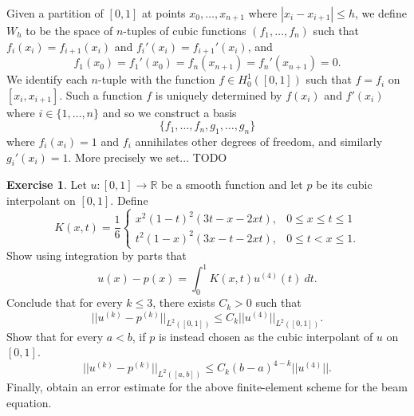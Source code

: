 \documentclass[10pt]{article}
\newcommand{\RR}{\mathbb{R}}
\theoremstyle{definition}
\newtheorem{exer}{Exercise}
\begin{document}
Given a partition of $[0, 1]$ at points $x_0, \dots, x_{n + 1}$ where $|x_i - x_{i + 1}| \leq h$, we define $W_h$ to be the space of $n$-tuples of cubic functions $(f_1, \dots, f_n)$ such that $f_i(x_i) = f_{i + 1}(x_i)$ and $f_i'(x_i) = f_{i + 1}'(x_i)$, and
$$f_1(x_0) = f_1'(x_0) = f_n(x_{n + 1}) = f_n'(x_{n + 1}) = 0.$$
We identify each $n$-tuple with the function $f \in H^1_0([0, 1])$ such that $f = f_i$ on $[x_i, x_{i + 1}]$.
Such a function $f$ is uniquely determined by $f(x_i)$ and $f'(x_i)$ where $i \in \{1, \dots, n\}$ and so we construct a basis
$$\{f_1, \dots, f_n, g_1, \dots, g_n\}$$
where $f_i(x_i) = 1$ and $f_i$ annihilates other degrees of freedom, and similarly $g_i'(x_i) = 1$.
More precisely we set... TODO

\begin{exer}
Let $u: [0, 1] \to \RR$ be a smooth function and let $p$ be its cubic interpolant on $[0, 1]$.
Define 
$$K(x, t) = \frac{1}{6} \begin{cases} x^2 (1 - t)^2 (3t - x - 2xt), & 0 \leq x \leq t \leq 1 \\
t^2(1 - x)^2(3x - t - 2xt), & 0 \leq t < x \leq 1.
\end{cases}$$
Show using integration by parts that 
$$u(x) - p(x) = \int_0^1 K(x, t) u^{(4)}(t) ~dt.$$
Conclude that for every $k \leq 3$, there exists $C_k > 0$ such that 
$$||u^{(k)} - p^{(k)}||_{L^2([0, 1])} \leq C_k ||u^{(4)}||_{L^2([0, 1])}.$$
Show that for every $a < b$, if $p$ is instead chosen as the cubic interpolant of $u$ on $[0, 1]$.
$$||u^{(k)} - p^{(k)}||_{L^2([a, b])} \leq C_k (b - a)^{4 - k} ||u^{(4)}||.$$
Finally, obtain an error estimate for the above finite-element scheme for the beam equation.
\end{exer}
\end{document}
